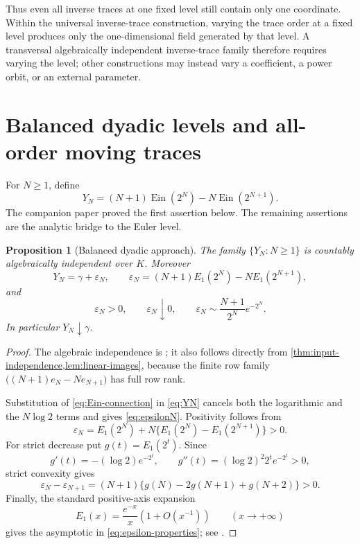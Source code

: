 \documentclass[11pt]{article}
\theoremstyle{keio}
\newtheorem{proposition}[theorem]{Proposition}
\theoremstyle{definition}
\theoremstyle{remark}
\newcommand{\Ein}{\operatorname{Ein}}
\begin{document}
Thus even all inverse traces at one fixed level still contain only one
coordinate.  Within the universal inverse-trace construction, varying the
trace order at a fixed level produces only the one-dimensional field
generated by that level.  A transversal algebraically independent
inverse-trace family therefore requires varying the level; other constructions
may instead vary a coefficient, a power orbit, or an external parameter.

\section{Balanced dyadic levels and all-order moving traces}
\label{sec:dyadic}

For \(N\ge1\), define
\begin{equation}\label{eq:YN}
 Y_N=(N+1)\Ein(2^N)-N\Ein(2^{N+1}).
\end{equation}
The companion paper proved the first assertion below.  The remaining
assertions are the analytic bridge to the Euler level.

\begin{proposition}[Balanced dyadic approach]
\label{prop:dyadic-approach}
The family \(\{Y_N:N\ge1\}\) is countably algebraically independent over
\(K\).  Moreover
\begin{equation}\label{eq:epsilonN}
 Y_N=\gamma+\varepsilon_N,
 \qquad
 \varepsilon_N=(N+1)E_1(2^N)-NE_1(2^{N+1}),
\end{equation}
and
\begin{equation}\label{eq:epsilon-properties}
 \varepsilon_N>0,\qquad
 \varepsilon_N\downarrow0,\qquad
 \varepsilon_N\sim\frac{N+1}{2^N}e^{-2^N}.
\end{equation}
In particular \(Y_N\downarrow\gamma\).
\end{proposition}

\begin{proof}
The algebraic independence is \cite[Lem.~11.2]{KEIO2026I}; it also follows directly from
\cref{thm:input-independence,lem:linear-images}, because the finite row family
\(\bigl((N+1)e_N-Ne_{N+1}\bigr)\) has full row rank.

Substitution of \eqref{eq:Ein-connection} in \eqref{eq:YN} cancels both the
logarithmic and the \(N\log2\) terms and gives \eqref{eq:epsilonN}.  Positivity
follows from
\[
 \varepsilon_N
 =E_1(2^N)+N\{E_1(2^N)-E_1(2^{N+1})\}>0.
\]
For strict decrease put \(g(t)=E_1(2^t)\).  Since
\[
 g'(t)=-(\log2)e^{-2^t},\qquad
 g''(t)=(\log2)^2 2^t e^{-2^t}>0,
\]
strict convexity gives
\[
 \varepsilon_N-\varepsilon_{N+1}
 =(N+1)\{g(N)-2g(N+1)+g(N+2)\}>0.
\]
Finally, the standard positive-axis expansion
\begin{equation}\label{eq:E1-asymptotic}
 E_1(x)=\frac{e^{-x}}x\left(1+O(x^{-1})\right)
 \qquad(x\to+\infty)
\end{equation}
gives the asymptotic in \eqref{eq:epsilon-properties}; see
\cite[\S6.12\(i\)]{DLMF}.
\end{proof}
\end{document}
